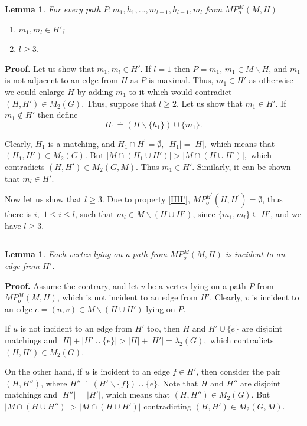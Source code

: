 \documentclass[a4paper, 12pt]{article}
\newtheorem{lemmasection}[definition]{Lemma}
\newenvironment{proof}[1][Proof]{\noindent\textbf{#1.} }{\ \rule{0.5em}{0.5em}}
\begin{document}
\begin{lemmasection}\label{MHmain_property}
For every path $P : m_1, h_1, ..., m_{l-1}, h_{l-1}, m_l$ from
$MP_o^M(M,H)$
\renewcommand{\labelenumi}{(\arabic{enumi})}
\begin{enumerate}
\item \label{endedgesH'} $m_1, m_l \in H'$;
\item \label{l>=3} $l\geq 3$.
\end{enumerate}
\end{lemmasection}
\begin{proof}
Let us show that $m_1, m_l \in H'$. If $l = 1$ then $P = m_1$, $m_1
\in M \backslash H$, and $m_1$ is not adjacent to an edge from $H$
as $P$ is maximal. Thus, $m_1 \in H'$ as otherwise we could enlarge
$H$ by adding $m_1$ to it which would contradict $(H, H') \in
M_2(G)$. Thus, suppose that $l \geq 2$. Let us show that $m_1 \in
H'$. If $m_1 \notin H'$ then define
$$H_1 \doteq (H \backslash \{h_1\}) \cup \{m_1\}.$$

Clearly, $H_1$ is a matching, and $H_{1}\cap H^{\prime }=\emptyset,
\ |H_1| = |H|,$ which means that $(H_1, H') \in M_2(G)$. But $|M
\cap (H_1 \cup H')| > |M \cap (H \cup H')|,$ which contradicts $(H,
H') \in M_2(G, M)$. Thus $m_1 \in H'$. Similarly, it can be shown
that $m_l \in H'$.

Now let us show that $l\geq 3$. Due to property \ref{HH'},
$MP_{o}^{H^{\prime }}(H,H^{\prime })=\emptyset $, thus there is $i,$
$1\leq i\leq l$, such that $m_i \in M \backslash (H \cup H')$, since
$\{m_1, m_l\} \subseteq H'$, and we have $l \geq 3$.
\end{proof}

\begin{lemmasection}\label{M_HandH's}
Each vertex lying on a path from $MP_o^M(M,H)$ is incident to an
edge from $H'$.
\end{lemmasection}
\begin{proof}
Assume the contrary, and let $v$ be a vertex lying on a path $P$
from $MP_o^M(M,H)$, which is not incident to an edge from $H'$.
Clearly, $v$ is incident to an edge $e = (u, v) \in M \backslash (H
\cup H')$ lying on $P$.

If $u$ is not incident to an edge from $H'$ too, then $H$ and $H'
\cup \{e\}$ are disjoint matchings and $|H|+|H' \cup
\{e\}|>|H|+|H'|=\lambda _{2}(G),$ which contradicts $(H,H') \in
M_2(G)$.

On the other hand, if $u$ is incident to an edge $f\in H'$, then
consider the pair $(H,H'')$, where $H'' \doteq (H' \backslash \{f\})
\cup \{e\}$. Note that $H$ and $H''$ are disjoint matchings and
$|H''| = |H'|$, which means that $(H, H'') \in M_2(G)$. But $|M \cap
(H \cup H'')| > |M \cap (H \cup H')|$ contradicting $(H, H') \in
M_2(G, M)$.
\end{proof}
\end{document}
